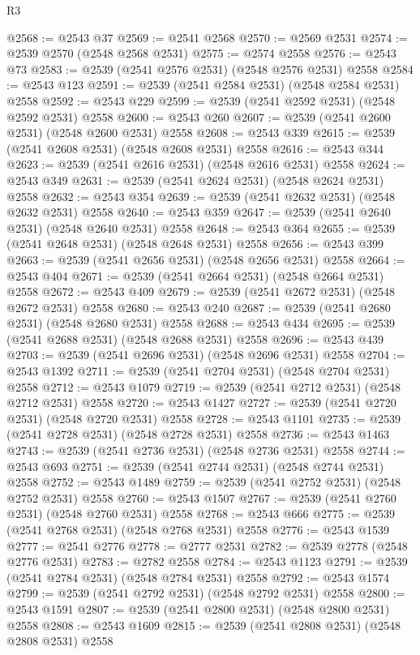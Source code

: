 \begin{lexlean}{R3}
\begin{coremodule}
@2568 := @2543 @37
@2569 := @2541 @2568
@2570 := @2569 @2531
@2574 := @2539 @2570 (@2548 @2568 @2531)
@2575 := @2574 @2558
@2576 := @2543 @73
@2583 := @2539 (@2541 @2576 @2531) (@2548 @2576 @2531) @2558
@2584 := @2543 @123
@2591 := @2539 (@2541 @2584 @2531) (@2548 @2584 @2531) @2558
@2592 := @2543 @229
@2599 := @2539 (@2541 @2592 @2531) (@2548 @2592 @2531) @2558
@2600 := @2543 @260
@2607 := @2539 (@2541 @2600 @2531) (@2548 @2600 @2531) @2558
@2608 := @2543 @339
@2615 := @2539 (@2541 @2608 @2531) (@2548 @2608 @2531) @2558
@2616 := @2543 @344
@2623 := @2539 (@2541 @2616 @2531) (@2548 @2616 @2531) @2558
@2624 := @2543 @349
@2631 := @2539 (@2541 @2624 @2531) (@2548 @2624 @2531) @2558
@2632 := @2543 @354
@2639 := @2539 (@2541 @2632 @2531) (@2548 @2632 @2531) @2558
@2640 := @2543 @359
@2647 := @2539 (@2541 @2640 @2531) (@2548 @2640 @2531) @2558
@2648 := @2543 @364
@2655 := @2539 (@2541 @2648 @2531) (@2548 @2648 @2531) @2558
@2656 := @2543 @399
@2663 := @2539 (@2541 @2656 @2531) (@2548 @2656 @2531) @2558
@2664 := @2543 @404
@2671 := @2539 (@2541 @2664 @2531) (@2548 @2664 @2531) @2558
@2672 := @2543 @409
@2679 := @2539 (@2541 @2672 @2531) (@2548 @2672 @2531) @2558
@2680 := @2543 @240
@2687 := @2539 (@2541 @2680 @2531) (@2548 @2680 @2531) @2558
@2688 := @2543 @434
@2695 := @2539 (@2541 @2688 @2531) (@2548 @2688 @2531) @2558
@2696 := @2543 @439
@2703 := @2539 (@2541 @2696 @2531) (@2548 @2696 @2531) @2558
@2704 := @2543 @1392
@2711 := @2539 (@2541 @2704 @2531) (@2548 @2704 @2531) @2558
@2712 := @2543 @1079
@2719 := @2539 (@2541 @2712 @2531) (@2548 @2712 @2531) @2558
@2720 := @2543 @1427
@2727 := @2539 (@2541 @2720 @2531) (@2548 @2720 @2531) @2558
@2728 := @2543 @1101
@2735 := @2539 (@2541 @2728 @2531) (@2548 @2728 @2531) @2558
@2736 := @2543 @1463
@2743 := @2539 (@2541 @2736 @2531) (@2548 @2736 @2531) @2558
@2744 := @2543 @693
@2751 := @2539 (@2541 @2744 @2531) (@2548 @2744 @2531) @2558
@2752 := @2543 @1489
@2759 := @2539 (@2541 @2752 @2531) (@2548 @2752 @2531) @2558
@2760 := @2543 @1507
@2767 := @2539 (@2541 @2760 @2531) (@2548 @2760 @2531) @2558
@2768 := @2543 @666
@2775 := @2539 (@2541 @2768 @2531) (@2548 @2768 @2531) @2558
@2776 := @2543 @1539
@2777 := @2541 @2776
@2778 := @2777 @2531
@2782 := @2539 @2778 (@2548 @2776 @2531)
@2783 := @2782 @2558
@2784 := @2543 @1123
@2791 := @2539 (@2541 @2784 @2531) (@2548 @2784 @2531) @2558
@2792 := @2543 @1574
@2799 := @2539 (@2541 @2792 @2531) (@2548 @2792 @2531) @2558
@2800 := @2543 @1591
@2807 := @2539 (@2541 @2800 @2531) (@2548 @2800 @2531) @2558
@2808 := @2543 @1609
@2815 := @2539 (@2541 @2808 @2531) (@2548 @2808 @2531) @2558

\end{coremodule}
\end{lexlean}
